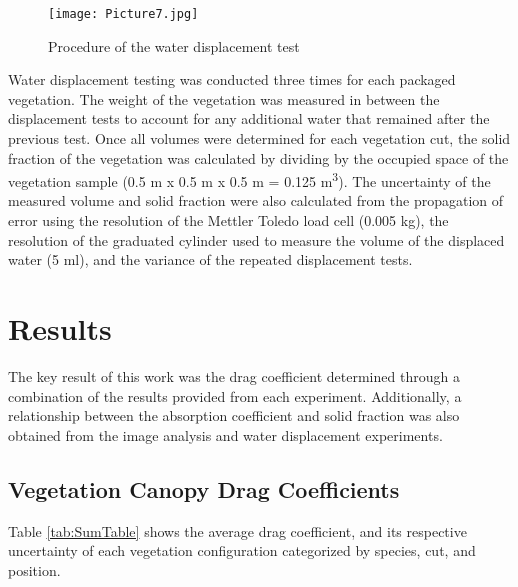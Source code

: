 \documentclass[12pt]{article}
\begin{document}
\begin{figure} [!ht]
	\centering 	\texttt{[image: Picture7.jpg]}
	\caption{Procedure of the water displacement test}
	\label{fig:wdt}
\end{figure}

\indent Water displacement testing was conducted three times for each packaged vegetation. The weight of the vegetation was measured in between the displacement tests to account for any additional water that remained after the previous test. Once all volumes were determined for each vegetation cut, the solid fraction of the vegetation was calculated by dividing by the occupied space of the vegetation sample (0.5 \si{m} x 0.5 \si{m} x 0.5 \si{m} = 0.125 \si{m^{3}}). The uncertainty of the measured volume and solid fraction were also calculated from the propagation of error using the resolution of the Mettler Toledo load cell (0.005 kg), the resolution of the graduated cylinder used to measure the volume of the displaced water (5 ml), and the variance of the repeated displacement tests.

\pagebreak


\section{Results}
\label{sec:results}
The key result of this work was the drag coefficient determined through a combination of the results provided from each experiment. Additionally, a relationship between the absorption coefficient and solid fraction was also obtained from the image analysis and water displacement experiments.

\subsection{Vegetation Canopy Drag Coefficients}
\label{ssec:headingscap}
Table \ref{tab:SumTable} shows the average drag coefficient, and its respective uncertainty of each vegetation configuration categorized by species, cut, and position.

\end{document}
